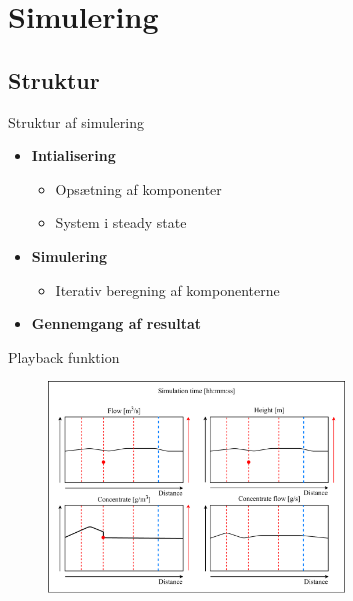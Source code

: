 	
\section{Simulering}
\subsection{Struktur}
\begin{frame}{Struktur af simulering}{}
\vfill\vfill\centering

\begin{itemize}
	\item<1-> \textbf{Intialisering}
	\vspace{3mm}
	\begin{itemize}
	\item<2-> Opsætning af komponenter
	\vspace{3mm}
	\item<3-> System i steady state
	\end{itemize}
	\vspace{3mm}
	\item<4-> \textbf{Simulering}
	\vspace{3mm}
	\begin{itemize}
	\item<5-> Iterativ beregning af komponenterne
	\end{itemize}
	\vspace{3mm}
	\item<6-> \textbf{Gennemgang af resultat}
\end{itemize}

\vfill\vfill		
\end{frame}

\begin{frame}{Playback funktion}{}
\vfill\vfill\centering
		\begin{figure}[H]
			\centering
			\includegraphics[width=0.7\textwidth]{Sections/pictures/display_results.pdf}
		\end{figure}
\vfill\vfill		
\end{frame}

